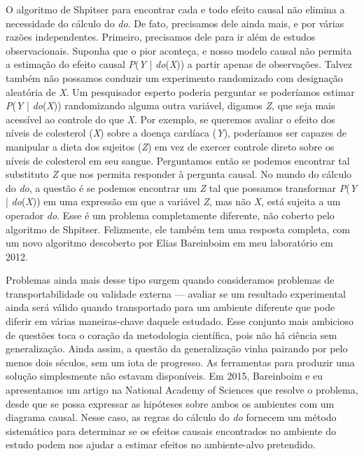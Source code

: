 \documentclass[11pt,a5paper,twoside]{book}
\begin{document}
O algoritmo de Shpitser para encontrar cada e todo efeito causal não elimina a necessidade do cálculo do \textit{do}. De fato, precisamos dele ainda mais, e por várias razões independentes. Primeiro, precisamos dele para ir além de estudos observacionais. Suponha que o pior aconteça, e nosso modelo causal não permita a estimação do efeito causal \textit{P}(\textit{Y} | \textit{do}(\textit{X})) a partir apenas de observações. Talvez também não possamos conduzir um experimento randomizado com designação aleatória de \textit{X}. Um pesquisador esperto poderia perguntar se poderíamos estimar \textit{P}(\textit{Y} | \textit{do}(\textit{X})) randomizando alguma outra variável, digamos \textit{Z}, que seja mais acessível ao controle do que \textit{X}. Por exemplo, se queremos avaliar o efeito dos níveis de colesterol (\textit{X}) sobre a doença cardíaca (\textit{Y}), poderíamos ser capazes de manipular a dieta dos sujeitos (\textit{Z}) em vez de exercer controle direto sobre os níveis de colesterol em seu sangue. Perguntamos então se podemos encontrar tal substituto \textit{Z} que nos permita responder à pergunta causal. No mundo do cálculo do \textit{do}, a questão é se podemos encontrar um \textit{Z} tal que possamos transformar \textit{P}(\textit{Y} | \textit{do}(\textit{X})) em uma expressão em que a variável \textit{Z}, mas não \textit{X}, está sujeita a um operador \textit{do}. Esse é um problema completamente diferente, não coberto pelo algoritmo de Shpitser. Felizmente, ele também tem uma resposta completa, com um novo algoritmo descoberto por Elias Bareinboim em meu laboratório em 2012.

Problemas ainda mais desse tipo surgem quando consideramos problemas de transportabilidade ou validade externa — avaliar se um resultado experimental ainda será válido quando transportado para um ambiente diferente que pode diferir em várias maneiras-chave daquele estudado. Esse conjunto mais ambicioso de questões toca o coração da metodologia científica, pois não há ciência sem generalização. Ainda assim, a questão da generalização vinha pairando por pelo menos dois séculos, sem um iota de progresso. As ferramentas para produzir uma solução simplesmente não estavam disponíveis. Em 2015, Bareinboim e eu apresentamos um artigo na National Academy of Sciences que resolve o problema, desde que se possa expressar as hipóteses sobre ambos os ambientes com um diagrama causal. Nesse caso, as regras do cálculo do \textit{do} fornecem um método sistemático para determinar se os efeitos causais encontrados no ambiente do estudo podem nos ajudar a estimar efeitos no ambiente-alvo pretendido.
\end{document}

